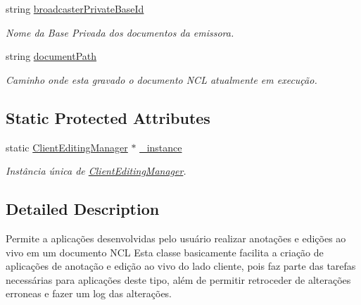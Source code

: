\begin{DoxyCompactItemize}
string \hyperlink{classbr_1_1ufscar_1_1lince_1_1ginga_1_1wac_1_1editing_1_1ClientEditingManager_ae6f42fa31a4a78d07977ee83561ed60d}{broadcasterPrivateBaseId}
\begin{DoxyCompactList}\small\item\em Nome da Base Privada dos documentos da emissora. \item\end{DoxyCompactList}\item 
string \hyperlink{classbr_1_1ufscar_1_1lince_1_1ginga_1_1wac_1_1editing_1_1ClientEditingManager_a259109a4e6e19ad1cc8b193f99140c7d}{documentPath}
\begin{DoxyCompactList}\small\item\em Caminho onde esta gravado o documento NCL atualmente em execução. \item\end{DoxyCompactList}\end{DoxyCompactItemize}
\subsection*{Static Protected Attributes}
\begin{DoxyCompactItemize}
\item 
static \hyperlink{classbr_1_1ufscar_1_1lince_1_1ginga_1_1wac_1_1editing_1_1ClientEditingManager}{ClientEditingManager} $\ast$ \hyperlink{classbr_1_1ufscar_1_1lince_1_1ginga_1_1wac_1_1editing_1_1ClientEditingManager_a127cda95b090ee9d020494d2c958be62}{\_\-instance}
\begin{DoxyCompactList}\small\item\em Instância única de \hyperlink{classbr_1_1ufscar_1_1lince_1_1ginga_1_1wac_1_1editing_1_1ClientEditingManager}{ClientEditingManager}. \item\end{DoxyCompactList}\end{DoxyCompactItemize}


\subsection{Detailed Description}
Permite a aplicações desenvolvidas pelo usuário realizar anotações e edições ao vivo em um documento NCL Esta classe basicamente facilita a criação de aplicações de anotação e edição ao vivo do lado cliente, pois faz parte das tarefas necessárias para aplicações deste tipo, além de permitir retroceder de alterações erroneas e fazer um log das alterações. 


